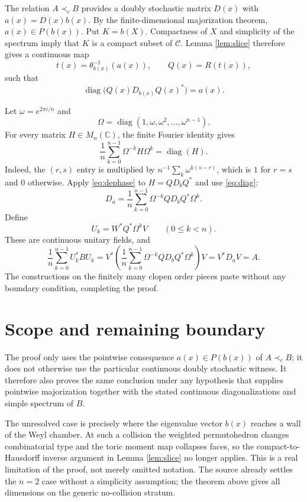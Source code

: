 \documentclass[11pt]{article}
\newcommand{\C}{\mathbb C}
\newcommand{\diag}{\operatorname{diag}}
\begin{document}
The relation $A\prec_cB$ provides a doubly stochastic matrix $D(x)$ with
$a(x)=D(x)b(x)$.  By the finite-dimensional majorization theorem,
$a(x)\in P(b(x))$.  Put $K=b(X)$.  Compactness of $X$ and simplicity of the
spectrum imply that $K$ is a compact subset of $\mathcal C$.  Lemma
\ref{lem:slice} therefore gives a continuous map
\[
       t(x)=\theta_{b(x)}^{-1}(a(x)),\qquad Q(x)=R(t(x)),
\]
such that
\begin{equation}\label{eq:diag}
       \diag\bigl(Q(x)D_{b(x)}Q(x)^*\bigr)=a(x).
\end{equation}

Let $\omega=e^{2\pi i/n}$ and
\[
       \Omega=\diag(1,\omega,\omega^2,\ldots,\omega^{n-1}).
\]
For every matrix $H\in M_n(\C)$, the finite Fourier identity gives
\begin{equation}\label{eq:dephase}
       \frac1n\sum_{k=0}^{n-1}\Omega^{-k}H\Omega^k=\diag(H).
\end{equation}
Indeed, the $(r,s)$ entry is multiplied by
$n^{-1}\sum_k\omega^{k(s-r)}$, which is $1$ for $r=s$ and $0$ otherwise.
Apply \eqref{eq:dephase} to $H=QD_bQ^*$ and use \eqref{eq:diag}:
\[
 D_a=\frac1n\sum_{k=0}^{n-1}
       \Omega^{-k}QD_bQ^*\Omega^k.
\]
Define
\[
                  U_k=W^*Q^*\Omega^kV\qquad(0\leq k<n).
\]
These are continuous unitary fields, and
\[
 \frac1n\sum_{k=0}^{n-1}U_k^*BU_k
 =V^*\left(\frac1n\sum_{k=0}^{n-1}
       \Omega^{-k}QD_bQ^*\Omega^k\right)V
 =V^*D_aV=A.
\]
The constructions on the finitely many clopen order pieces paste without any
boundary condition, completing the proof.

\section{Scope and remaining boundary}

The proof only uses the pointwise consequence $a(x)\in P(b(x))$ of
$A\prec_cB$; it does not otherwise use the particular continuous doubly
stochastic witness.  It therefore also proves the same conclusion under any
hypothesis that supplies pointwise majorization together with the stated
continuous diagonalizations and simple spectrum of $B$.

The unresolved case is precisely where the eigenvalue vector $b(x)$ reaches a
wall of the Weyl chamber.  At such a collision the weighted permutohedron
changes combinatorial type and the toric moment map collapses faces, so the
compact-to-Hausdorff inverse argument in Lemma \ref{lem:slice} no longer
applies.  This is a real limitation of the proof, not merely omitted notation.
The source already settles the $n=2$ case without a simplicity assumption;
the theorem above gives all dimensions on the generic no-collision stratum.
\end{document}
